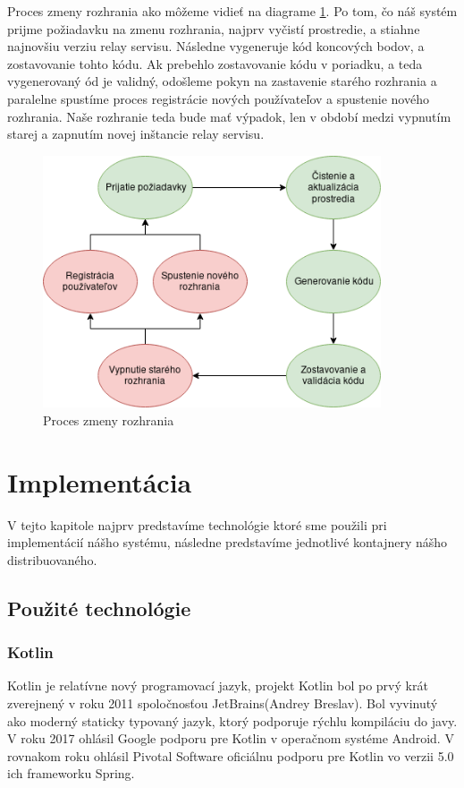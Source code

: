 Proces zmeny rozhrania ako môžeme vidieť na diagrame \ref{change_operation}.
Po tom, čo náš systém prijme požiadavku na zmenu rozhrania, najprv vyčistí prostredie, a stiahne najnovšiu verziu relay servisu. Následne vygeneruje kód koncových bodov, a zostavovanie tohto kódu. Ak prebehlo zostavovanie kódu v poriadku, a teda vygenerovaný ód je validný, odošleme pokyn na zastavenie starého rozhrania a paralelne spustíme proces registrácie nových používateľov a spustenie nového rozhrania. Naše rozhranie teda bude mať výpadok, len v období medzi vypnutím starej a zapnutím novej inštancie relay servisu.

\begin{figure}[!htbp]
	\centering
	\includegraphics[width=10cm]{img/change_operation.png}
	\caption{Proces zmeny rozhrania}
	\label{change_operation}
\end{figure}

\section{Implementácia}
V tejto kapitole najprv predstavíme technológie ktoré sme použili pri implementácií nášho systému, následne predstavíme jednotlivé kontajnery nášho distribuovaného.

\subsection{Použité technológie}

\subsubsection{Kotlin}
Kotlin je relatívne nový programovací jazyk, projekt Kotlin bol po prvý krát zverejnený v roku 2011 spoločnosťou JetBrains(Andrey Breslav). Bol vyvinutý ako moderný staticky typovaný jazyk, ktorý podporuje rýchlu kompiláciu do javy. V roku 2017 ohlásil Google podporu pre Kotlin v operačnom systéme Android. V rovnakom roku ohlásil Pivotal Software oficiálnu podporu pre Kotlin vo verzii 5.0 ich frameworku Spring.

